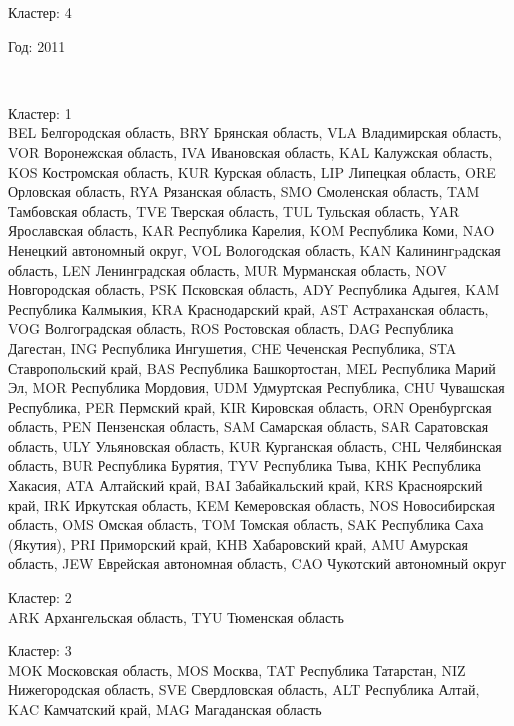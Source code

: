 \documentclass[11pt]{article}
\begin{document}
Кластер:  4 \\

\begin{center}
Год:  2011
\end{center}

    \begin{center}
    \end{center}
    { \hspace*{\fill} \\}
    
Кластер:  1 \\
BEL Белгородская область, BRY Брянская область, VLA Владимирская область, VOR Воронежская область, IVA Ивановская область, KAL Калужская область, KOS Костромская область, KUR Курская область, LIP Липецкая область, ORE Орловская область, RYA Рязанская область, SMO Смоленская область, TAM Тамбовская область, TVE Тверская область, TUL Тульская область, YAR Ярославская область, KAR Республика Карелия, KOM Республика Коми, NAO Ненецкий автономный округ, VOL Вологодская область, KAN Калинингpадская область, LEN Ленинградская область, MUR Мурманская область, NOV Новгородская область, PSK Псковская область, ADY Республика Адыгея, KAM Республика Калмыкия, KRA Краснодарский край, AST Астраханская область, VOG Волгоградская область, ROS Ростовская область, DAG Республика Дагестан, ING Республика Ингушетия, CHE Чеченская Республика, STA Ставропольский край, BAS Республика Башкортостан, MEL Республика Марий Эл, MOR Республика Мордовия, UDM Удмуртская Республика, CHU Чувашская Республика, PER Пермский край, KIR Кировская область, ORN Оренбургская область, PEN Пензенская область, SAM Самарская область, SAR Саратовская область, ULY Ульяновская область, KUR Курганская область, CHL Челябинская область, BUR Республика Бурятия, TYV Республика Тыва, KHK Республика Хакасия, ATA Алтайский край, BAI Забайкальский край, KRS Красноярский край, IRK Иркутская область, KEM Кемеровская область, NOS Новосибирская область, OMS Омская область, TOM Томская область, SAK Республика Саха (Якутия), PRI Приморский край, KHB Хабаровский край, AMU Амурская область, JEW Еврейская автономная область, CAO Чукотский автономный округ

Кластер:  2 \\
ARK Архангельская область, TYU Тюменская область

Кластер:  3 \\
MOK Московская область, MOS Москва, TAT Республика Татарстан, NIZ Нижегородская область, SVE Свердловская область, ALT Республика Алтай, KAC Камчатский край, MAG Магаданская область
\end{document}
